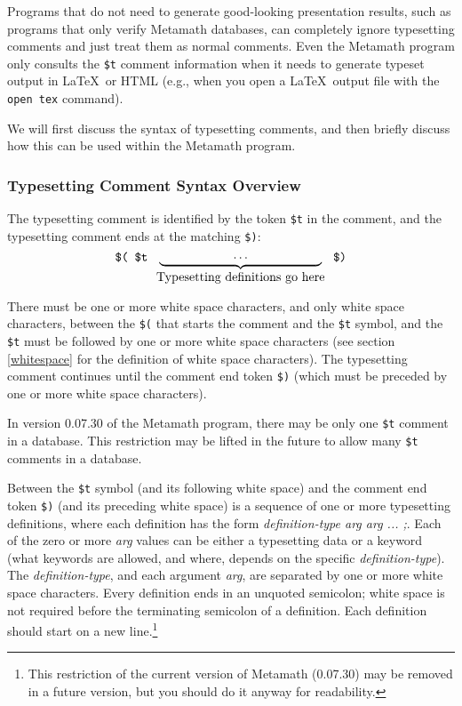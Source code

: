 Programs that do not need to generate good-looking presentation results,
such as programs that only verify Metamath databases,
can completely ignore typesetting comments
and just treat them as normal comments.
Even the Metamath program only consults the
\texttt{\$t} comment information when it needs to generate typeset output
in \LaTeX\ or {\sc HTML}
(e.g., when you open a \LaTeX\ output file with the \texttt{open tex} command).

We will first discuss the syntax of typesetting comments, and then
briefly discuss how this can be used within the Metamath program.

\subsubsection{Typesetting Comment Syntax Overview}

The typesetting comment is identified by the token
\texttt{\$t} in
the comment, and the typesetting comment ends at the matching
\texttt{\$)}:
\[
  \mbox{\tt \$(\ }
  \mbox{\tt \$t\ }
  \underbrace{
    \mbox{\tt \ \ \ \ \ \ \ \ \ \ \ }
    \cdots
    \mbox{\tt \ \ \ \ \ \ \ \ \ \ \ }
  }_{\mbox{Typesetting definitions go here}}
  \mbox{\tt \ \$)}
\]

There must be one or more white space characters, and only white space
characters, between the \texttt{\$(} that starts the comment
and the \texttt{\$t} symbol,
and the \texttt{\$t} must be followed by one
or more white space characters
(see section \ref{whitespace} for the definition of white space characters).
The typesetting comment continues until the comment end token \texttt{\$)}
(which must be preceded by one or more white space characters).

In version 0.07.30 of the
Metamath program, there may be only one \texttt{\$t} comment in a
database.  This restriction may be lifted in the future to allow
many \texttt{\$t} comments in a database.

Between the \texttt{\$t} symbol (and its following white space) and the
comment end token \texttt{\$)} (and its preceding white space)
is a sequence of one or more typesetting definitions, where
each definition has the form
\textit{definition-type arg arg ... ;}.
Each of the zero or more \textit{arg} values
can be either a typesetting data or a keyword
(what keywords are allowed, and where, depends on the specific
\textit{definition-type}).
The \textit{definition-type}, and each argument \textit{arg},
are separated by one or more white space characters.
Every definition ends in an unquoted semicolon;
white space is not required before the terminating semicolon of a definition.
Each definition should start on a new line.\footnote{This
restriction of the current version of Metamath
(0.07.30) may be removed
in a future version, but you should do it anyway for readability.}

